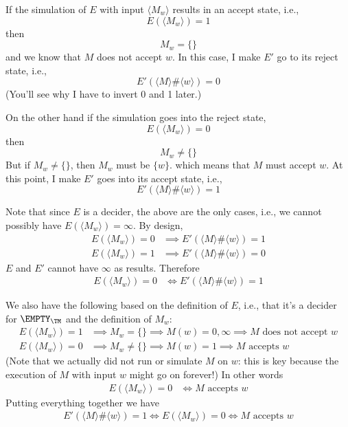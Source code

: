 \begin{tightlist}

\item If the simulation of $E$ with input 
$\langle M_w \rangle$ results in an accept state, i.e.,
\[
E(\langle M_w \rangle) = 1
\]
then 
\[
M_{w} = \{\}
\]
and we know that $M$ does not accept $w$.
In this case, I make $E'$ go to its reject state, 
i.e.,
\[
E'(\langle M \rangle \# \langle w \rangle) = 0
\]
(You'll see why I have to invert 0 and 1 later.)

\item On the other hand if the simulation goes into the reject state,
\[
E(\langle M_w \rangle) = 0
\]
then
\[
M_{w} \neq \{\}
\]
But if $M_w \neq \{\}$, then $M_w$ must be $\{w\}$.
which means that $M$ must accept $w$.
At this point, I make $E'$ goes into its accept state, 
i.e.,
\[
E'(\langle M \rangle \# \langle w \rangle) = 1
\]
\end{tightlist}
Note that since $E$ is a decider, the above are the only cases,
i.e., we cannot possibly have $E(\langle M_w \rangle) = \infty$.
By design, 
\begin{align*}
E(\langle M_w \rangle) = 0 
&\implies E'(\langle M \rangle \# \langle w \rangle) = 1 \\
E(\langle M_w \rangle) = 1 
&\implies E'(\langle M \rangle \# \langle w \rangle) = 0
\end{align*}
$E$ and $E'$ cannot have $\infty$ as results.
Therefore
\begin{align*}
E(\langle M_w \rangle) = 0
&\iff E'(\langle M \rangle \# \langle w \rangle) = 1
\end{align*}

We also have the following based on the definition of $E$, 
i.e., that it's a decider for $\EMPTY_\TM$
and the definition of $M_w$:
\begin{align*}
E(\langle M_w \rangle) = 1 &\implies M_w = \{\} \implies M(w) = 0, \infty 
\implies M \text{ does not accept } w \\
E(\langle M_w \rangle) = 0 &\implies M_w \neq \{\} \implies M(w) = 1
\implies M \text{ accepts } w
\end{align*}
(Note that we actually did not run or simulate $M$ on $w$:
this is key because the execution of $M$ with input $w$ might go on
forever!)
In other words
\begin{align*}
E(\langle M_w \rangle) = 0
&\iff 
M \text{ accepts } w 
\end{align*}
Putting everything together we have
\begin{align*}
E'(\langle M \rangle \# \langle w \rangle) = 1
\iff
E(\langle M_w \rangle) = 0
\iff
M \text{ accepts } w
\end{align*}


